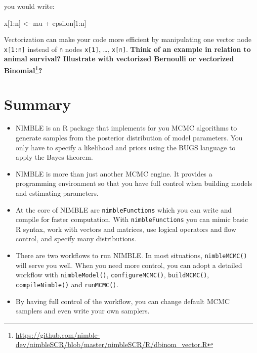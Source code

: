 \documentclass[
  12pt,
]{krantz}
\newenvironment{Shaded}{\begin{snugshade}}{\end{snugshade}}
\newcommand{\DecValTok}[1]{\textcolor[rgb]{0.00,0.00,0.81}{#1}}
\newcommand{\NormalTok}[1]{#1}
\newcommand{\OtherTok}[1]{\textcolor[rgb]{0.56,0.35,0.01}{#1}}
\newcommand{\SpecialCharTok}[1]{\textcolor[rgb]{0.00,0.00,0.00}{#1}}
\renewcommand{\href}[2]{#2\footnote{\url{#1}}}
\begin{document}
you would write:

\begin{Shaded}
\begin{Highlighting}[]
\NormalTok{x[}\DecValTok{1}\SpecialCharTok{:}\NormalTok{n] }\OtherTok{\textless{}{-}}\NormalTok{ mu }\SpecialCharTok{+}\NormalTok{ epsilon[}\DecValTok{1}\SpecialCharTok{:}\NormalTok{n]}
\end{Highlighting}
\end{Shaded}

Vectorization can make your code more efficient by manipulating one vector node \texttt{x{[}1:n{]}} instead of \texttt{n} nodes \texttt{x{[}1{]}}, \ldots, \texttt{x{[}n{]}}. \textbf{Think of an example in relation to animal survival? Illustrate with vectorized Bernoulli or \href{https://github.com/nimble-dev/nimbleSCR/blob/master/nimbleSCR/R/dbinom_vector.R}{vectorized Binomial}?}

\hypertarget{summary-1}{%
\section{Summary}\label{summary-1}}

\begin{itemize}
\item
  NIMBLE is an R package that implements for you MCMC algorithms to generate samples from the posterior distribution of model parameters. You only have to specify a likelihood and priors using the BUGS language to apply the Bayes theorem.
\item
  NIMBLE is more than just another MCMC engine. It provides a programming environment so that you have full control when building models and estimating parameters.
\item
  At the core of NIMBLE are \texttt{nimbleFunctions} which you can write and compile for faster computation. With \texttt{nimbleFunctions} you can mimic basic R syntax, work with vectors and matrices, use logical operators and flow control, and specify many distributions.
\item
  There are two workflows to run NIMBLE. In most situations, \texttt{nimbleMCMC()} will serve you well. When you need more control, you can adopt a detailed workflow with \texttt{nimbleModel()}, \texttt{configureMCMC()}, \texttt{buildMCMC()}, \texttt{compileNimble()} and \texttt{runMCMC()}.
\item
  By having full control of the workflow, you can change default MCMC samplers and even write your own samplers.
\end{itemize}
\end{document}
